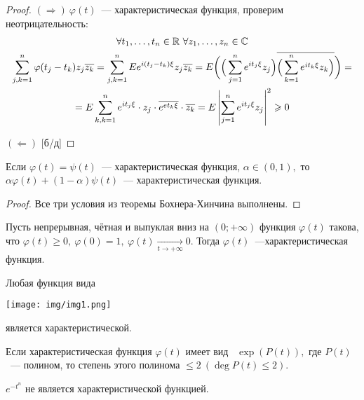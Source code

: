 	\begin{proof}
		\((\Rightarrow) ~ \varphi(t)\)~--- характеристическая функция, проверим неотрицательность:
		\begin{gather*}%
			\forall t_1, \ldots, t_n \in \R~\forall z_1, \ldots, z_n \in \mathbb{C}\\
			\sum\limits_{j, k = 1}^{n}\varphi(t_j - t_k)z_j \overline{z_k} =
			\sum\limits_{j, k = 1}^{n}Ee^{i(t_j - t_k)\xi}z_j\overline{z_k} = E\bigg(\Big(\sum\limits_{j = 1}^ne^{it_j\xi}z_j\Big)\overline{\Big(\sum\limits_{k = 1}^ne^{it_k\xi}z_k\Big)}\bigg) =\\
			= E \sum\limits_{k, k = 1}^{n}e^{it_j\xi}\cdot z_j \cdot \overline{e^{et_k\xi}}\cdot \overline{z_k} = E\left|\sum\limits_{j = 1}^{n} e^{it_j\xi}z_j\right|^2 \geqslant 0
		\end{gather*}
	
		\((\Leftarrow)\) [б/д]
	\end{proof}
	\begin{consequence}
		Если \(\varphi(t) = \psi(t)\)~--- характеристическая функция, \(\alpha \in (0, 1),\) то \(\alpha \varphi(t) + (1 - \alpha)\psi(t)\)~--- характеристическая функция.
	\end{consequence}
	\begin{proof}
		Все три условия из теоремы Бохнера-Хинчина выполнены.
	\end{proof}
	\begin{theorem}[Пойа(б/д)]
		Пусть непрерывная, чётная и выпуклая вниз на \((0; + \infty)\) функция \(\varphi(t)\) такова, что \(\varphi(t) \geqslant 0, ~ \varphi(0) = 1, ~\varphi(t) \underset{t \to +\infty}{\longrightarrow} 0\). Тогда \(\varphi(t)\)~---характеристическая функция.
	\end{theorem}

	\begin{example}
		Любая функция вида
		\begin{center}
			\texttt{[image: img/img1.png]}
		\end{center}
		является характеристической.
	\end{example}

	\begin{theorem}[Марцинкевича(б/д)]
		Если характеристическая функция \(\varphi(t)\) имеет вид ~\(\exp(P(t)),\) где \(P(t)\)~--- полином, то степень этого полинома \(\leqslant 2 ~(\deg P(t) \leqslant 2).\)
	\end{theorem}
	\begin{example}
		\(e^{-t^n}\) не является характеристической функцией.
	\end{example}

